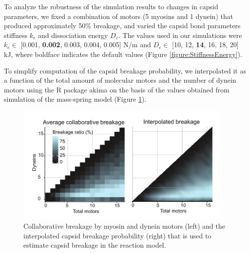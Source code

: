 To analyze the robustness of the simulation results to changes in capsid parameters, we fixed a combination of motors (5 myosins and 1 dynein) that produced approximately 50\% breakage, and varied the capsid bond parameters stiffness $k_e$ and dissociation energy $D_e$. The values used in our simulations were $k_e \in$ [0.001, \textbf{0.002}, 0.003, 0.004, 0.005] N/m and $D_e \in$ [10, 12, \textbf{14}, 16, 18, 20] kJ, where boldface indicates the default values (Figure \ref{figure:StiffnessEnergy}).

To simplify computation of the capsid breakage probability, we interpolated it as a function of the total amount of molecular motors and the number of dynein motors using the R package akima on the basis of the values obtained from simulation of the mass-spring model (Figure \ref{figure:MassSpringInterpolation}).

\begin{figure}
\begin{center}
\includegraphics[width=0.95\textwidth, trim={0cm 0cm 0cm 0cm}, clip]{D_chapters/1_TugOfWar/SUPPLEMENTARYFIGURE1D.pdf}
\caption[Collaborative breakage by molecular motors and the interpolated capsid breakage probability]%
{Collaborative breakage by myosin and dynein motors (left) and the interpolated capsid breakage probability (right) that is used to estimate capsid breakage in the reaction model.}
\label{figure:MassSpringInterpolation}
\end{center}
\end{figure}